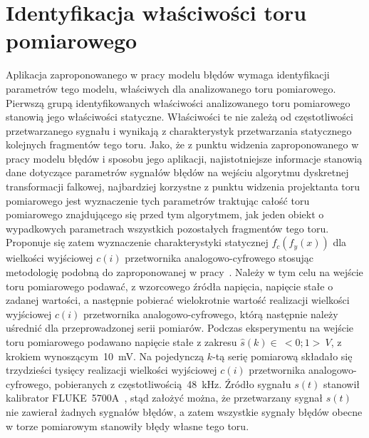 \section{Identyfikacja właściwości toru pomiarowego}

Aplikacja zaproponowanego w pracy modelu błędów wymaga identyfikacji parametrów tego modelu, właściwych dla analizowanego toru pomiarowego. Pierwszą grupą identyfikowanych właściwości analizowanego toru pomiarowego stanowią jego właściwości statyczne. Właściwości te nie zależą od częstotliwości przetwarzanego sygnału i wynikają z charakterystyk przetwarzania statycznego kolejnych fragmentów tego toru. Jako, że z punktu widzenia zaproponowanego w pracy modelu błędów i sposobu jego aplikacji, najistotniejsze informacje stanowią dane dotyczące parametrów sygnałów błędów na wejściu algorytmu dyskretnej transformacji falkowej, najbardziej korzystne z punktu widzenia projektanta toru pomiarowego jest wyznaczenie tych parametrów traktując całość toru pomiarowego znajdującego się przed tym algorytmem, jak jeden obiekt o wypadkowych parametrach wszystkich pozostałych fragmentów tego toru.
Proponuje się zatem wyznaczenie charakterystyki statycznej $f_{c}(f_{y}(x))$ dla wielkości wyjściowej $c(i)$ przetwornika analogowo-cyfrowego stosując metodologię podobną do zaproponowanej w pracy~\cite{kampik_przetworniki}. Należy w tym celu na wejście toru pomiarowego podawać, z wzorcowego źródła napięcia, napięcie stałe o zadanej wartości, a następnie pobierać wielokrotnie wartość realizacji wielkości wyjściowej $c(i)$ przetwornika analogowo-cyfrowego, którą następnie należy uśrednić dla przeprowadzonej serii pomiarów. Podczas eksperymentu na wejście toru pomiarowego podawano napięcie stałe z zakresu $\hat{s}(k) \in~<0;1>~\unit{V}$, z krokiem wynoszącym~\qty{10}{mV}. Na pojedynczą $k$-tą serię pomiarową składało się trzydzieści tysięcy realizacji wielkości wyjściowej $c(i)$ przetwornika analogowo-cyfrowego, pobieranych z częstotliwością~\qty{48}{kHz}. Źródło sygnału $s(t)$ stanowił kalibrator FLUKE~5700A~\cite{fluke_manual}, stąd założyć można, że przetwarzany sygnał $s(t)$ nie zawierał żadnych sygnałów błędów, a zatem wszystkie sygnały błędów obecne w torze pomiarowym stanowiły błędy własne tego toru.

